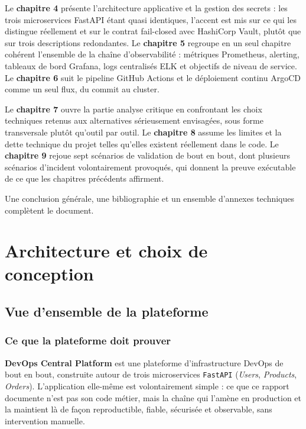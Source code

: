 \documentclass[12pt,a4paper,twoside,openright]{report}
\makeatletter
\def\cleardoublepage{\clearpage\if@twoside
  \ifodd\c@page\else\hbox{}\thispagestyle{empty}\newpage\fi\fi}
\makeatother
\begin{document}
Le \textbf{chapitre 4} présente l'architecture applicative et la gestion des
secrets : les trois microservices FastAPI étant quasi identiques, l'accent est mis
sur ce qui les distingue réellement et sur le contrat fail-closed avec HashiCorp
Vault, plutôt que sur trois descriptions redondantes. Le \textbf{chapitre 5} regroupe
en un seul chapitre cohérent l'ensemble de la chaîne d'observabilité : métriques
Prometheus, alerting, tableaux de bord Grafana, logs centralisés ELK et objectifs de
niveau de service. Le \textbf{chapitre 6} suit le pipeline GitHub Actions et le
déploiement continu ArgoCD comme un seul flux, du commit au cluster.

Le \textbf{chapitre 7} ouvre la partie analyse critique en confrontant les choix
techniques retenus aux alternatives sérieusement envisagées, sous forme
transversale plutôt qu'outil par outil. Le \textbf{chapitre 8} assume les limites et
la dette technique du projet telles qu'elles existent réellement dans le code. Le
\textbf{chapitre 9} rejoue sept scénarios de validation de bout en bout, dont
plusieurs scénarios d'incident volontairement provoqués, qui donnent la preuve
exécutable de ce que les chapitres précédents affirment.

Une conclusion générale, une bibliographie et un ensemble d'annexes techniques
complètent le document.

\cleardoublepage

\part{Architecture et choix de conception}

\chapter{Vue d'ensemble de la plateforme}

\section{Ce que la plateforme doit prouver}

\textbf{DevOps Central Platform} est une plateforme d'infrastructure DevOps de bout
en bout, construite autour de trois microservices \texttt{FastAPI} (\emph{Users},
\emph{Products}, \emph{Orders}). L'application elle-même est volontairement simple :
ce que ce rapport documente n'est pas son code métier, mais la chaîne qui l'amène en
production et la maintient là de façon reproductible, fiable, sécurisée et
observable, sans intervention manuelle.
\end{document}
